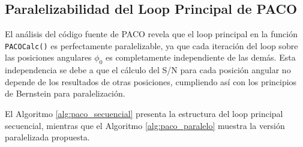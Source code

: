 \subsection{Paralelizabilidad del Loop Principal de PACO}

El análisis del código fuente de PACO revela que el loop principal en la función \texttt{PACOCalc()} es perfectamente paralelizable, ya que cada iteración del loop sobre las posiciones angulares $\phi_0$ es completamente independiente de las demás. Esta independencia se debe a que el cálculo del S/N para cada posición angular no depende de los resultados de otras posiciones, cumpliendo así con los principios de Bernstein para paralelización.

El Algoritmo \ref{alg:paco_secuencial} presenta la estructura del loop principal secuencial, mientras que el Algoritmo \ref{alg:paco_paralelo} muestra la versión paralelizada propuesta.

\begin{algorithm}[H]
\caption{PACO: Versión Secuencial del Loop Principal}
\label{alg:paco_secuencial}
\end{algorithm}

